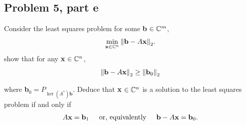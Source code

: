 \newpage
\subsection{Problem 5, part e}
Consider the least squares problem for some \textbf{b} $\in \mathbb{C}^m$,
\begin{align}
    \min_{\textbf{x} \in \mathbb{C}^n}\norm{\textbf{b} - A\textbf{x}}_2. \label{p5e: lsp}
\end{align}
show that for any \textbf{x} $\in \mathbb{C}^n$, 
\[
\norm{\textbf{b} - A\textbf{x}}_2 \geq \norm{\textbf{b}_0}_2
\]

where \textbf{b}$_0 = P_{\ker (A^*) \textbf{b}}$. Deduce that \textbf{x} $\in \mathbb{C}^n$ is a solution to the least squares problem if and only if
\begin{align}
A\textbf{x} = \textbf{b}_1 \hspace{5mm} \text{or, equivalently} \hspace{5mm} \textbf{b} - A\textbf{x} = \textbf{b}_0. \label{p5e: equiv}
\end{align}

